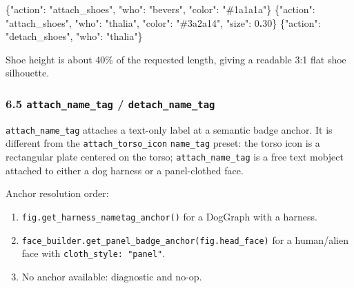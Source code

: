 \documentclass[
  11pt,
]{book}
\newenvironment{Shaded}{}{}
\newcommand{\DataTypeTok}[1]{\textcolor[rgb]{0.56,0.13,0.00}{#1}}
\newcommand{\DecValTok}[1]{\textcolor[rgb]{0.25,0.63,0.44}{#1}}
\newcommand{\ErrorTok}[1]{\textcolor[rgb]{1.00,0.00,0.00}{\textbf{#1}}}
\newcommand{\FunctionTok}[1]{\textcolor[rgb]{0.02,0.16,0.49}{#1}}
\newcommand{\StringTok}[1]{\textcolor[rgb]{0.25,0.44,0.63}{#1}}
\providecommand{\tightlist}{%
  \setlength{\itemsep}{0pt}\setlength{\parskip}{0pt}}
\begin{document}
\begin{Shaded}
\begin{Highlighting}[]
\FunctionTok{\{}\DataTypeTok{"action"}\FunctionTok{:} \StringTok{"attach\_shoes"}\FunctionTok{,} \DataTypeTok{"who"}\FunctionTok{:} \StringTok{"bevers"}\FunctionTok{,} \DataTypeTok{"color"}\FunctionTok{:} \StringTok{"\#1a1a1a"}\FunctionTok{\}}
\FunctionTok{\{}\DataTypeTok{"action"}\FunctionTok{:} \StringTok{"attach\_shoes"}\FunctionTok{,} \DataTypeTok{"who"}\FunctionTok{:} \StringTok{"thalia"}\FunctionTok{,} \DataTypeTok{"color"}\FunctionTok{:} \StringTok{"\#3a2a14"}\FunctionTok{,} \DataTypeTok{"size"}\FunctionTok{:} \DecValTok{0}\ErrorTok{.}\DecValTok{30}\FunctionTok{\}}
\FunctionTok{\{}\DataTypeTok{"action"}\FunctionTok{:} \StringTok{"detach\_shoes"}\FunctionTok{,} \DataTypeTok{"who"}\FunctionTok{:} \StringTok{"thalia"}\FunctionTok{\}}
\end{Highlighting}
\end{Shaded}

Shoe height is about 40\% of the requested length, giving a readable 3:1
flat shoe silhouette.

\subsubsection{\texorpdfstring{6.5 \texttt{attach\_name\_tag} /
\texttt{detach\_name\_tag}}{6.5 attach\_name\_tag / detach\_name\_tag}}\label{attach_name_tag-detach_name_tag}

\texttt{attach\_name\_tag} attaches a text-only label at a semantic
badge anchor. It is different from the \texttt{attach\_torso\_icon}
\texttt{name\_tag} preset: the torso icon is a rectangular plate
centered on the torso; \texttt{attach\_name\_tag} is a free text mobject
attached to either a dog harness or a panel-clothed face.

Anchor resolution order:

\begin{enumerate}
\def\labelenumi{\arabic{enumi}.}
\tightlist
\item
  \texttt{fig.get\_harness\_nametag\_anchor()} for a DogGraph with a
  harness.
\item
  \texttt{face\_builder.get\_panel\_badge\_anchor(fig.head\_face)} for a
  human/alien face with \texttt{cloth\_style:\ "panel"}.
\item
  No anchor available: diagnostic and no-op.
\end{enumerate}
\end{document}
